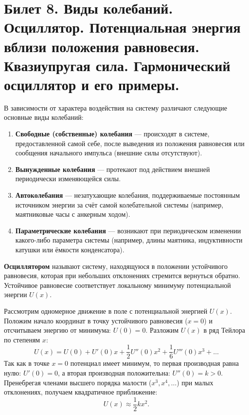 \section{Билет 8. Виды колебаний. Осциллятор. Потенциальная энергия вблизи положения равновесия. Квазиупругая сила. Гармонический осциллятор и его примеры.}

\begin{definition}
В зависимости от характера воздействия на систему различают следующие основные виды колебаний:
\begin{enumerate}
    \item \textbf{Свободные (собственные) колебания} --- происходят в системе, предоставленной самой себе, после выведения из положения равновесия или сообщения начального импульса (внешние силы отсутствуют).
    \item \textbf{Вынужденные колебания} --- протекают под действием внешней периодически изменяющейся силы.
    \item \textbf{Автоколебания} --- незатухающие колебания, поддерживаемые постоянным источником энергии за счёт самой колебательной системы (например, маятниковые часы с анкерным ходом).
    \item \textbf{Параметрические колебания} --- возникают при периодическом изменении какого-либо параметра системы (например, длины маятника, индуктивности катушки или ёмкости конденсатора).
\end{enumerate}
\end{definition}

\begin{definition}
\textbf{Осциллятором} называют систему, находящуюся в положении устойчивого равновесия, которая при небольших отклонениях стремится вернуться обратно. Устойчивое равновесие соответствует локальному минимуму потенциальной энергии $U(x)$.
\end{definition}

\begin{theorem}
Рассмотрим одномерное движение в поле с потенциальной энергией $U(x)$. Положим начало координат в точку устойчивого равновесия ($x=0$) и отсчитываем энергию от минимума: $U(0)=0$. Разложим $U(x)$ в ряд Тейлора по степеням $x$:
\begin{equation}
    U(x) = U(0) + U'(0)x + \frac{1}{2}U''(0)x^2 + \frac{1}{6}U'''(0)x^3 + \dots
\end{equation}
Так как в точке $x=0$ потенциал имеет минимум, то первая производная равна нулю: $U'(0)=0$, а вторая производная положительна: $U''(0) = k > 0$. Пренебрегая членами высшего порядка малости ($x^3, x^4, \dots$) при малых отклонениях, получаем квадратичное приближение:
\begin{equation}
    U(x) \approx \frac{1}{2}kx^2. \label{eq:potential_approx}
\end{equation}
\end{theorem}

